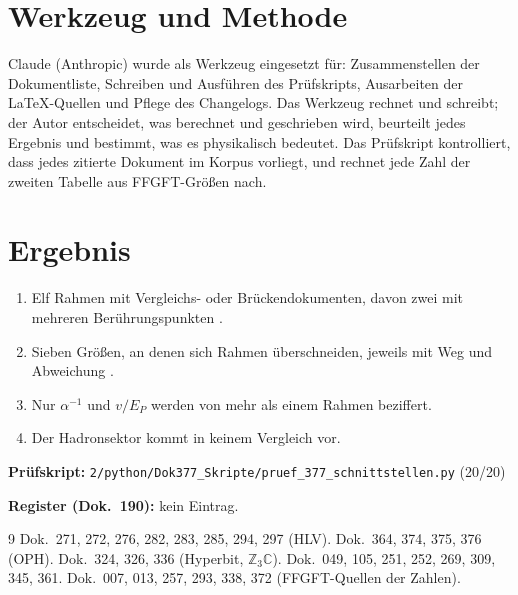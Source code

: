 \section*{Werkzeug und Methode}
Claude (Anthropic) wurde als Werkzeug eingesetzt für: Zusammenstellen der
Dokumentliste, Schreiben und Ausführen des Prüfskripts, Ausarbeiten der
\LaTeX-Quellen und Pflege des Changelogs. Das Werkzeug rechnet und schreibt;
der Autor entscheidet, was berechnet und geschrieben wird, beurteilt jedes
Ergebnis und bestimmt, was es physikalisch bedeutet. Das Prüfskript
kontrolliert, dass jedes zitierte Dokument im Korpus vorliegt, und rechnet
jede Zahl der zweiten Tabelle aus FFGFT-Größen nach.

\section{Ergebnis}

\begin{enumerate}
\item Elf Rahmen mit Vergleichs- oder Brückendokumenten, davon zwei mit
  mehreren Berührungspunkten \KM.
\item Sieben Größen, an denen sich Rahmen überschneiden, jeweils mit Weg und
  Abweichung \KM.
\item Nur $\alpha^{-1}$ und $v/E_P$ werden von mehr als einem Rahmen
  beziffert.
\item Der Hadronsektor kommt in keinem Vergleich vor.
\end{enumerate}

\medskip
\noindent\textbf{Prüfskript:} \texttt{2/python/Dok377\_Skripte/pruef\_377\_schnittstellen.py} (20/20)

\medskip
\noindent\textbf{Register (Dok.~190):} kein Eintrag.

\begin{thebibliography}{9}
 Dok.~271, 272, 276, 282, 283, 285, 294, 297 (HLV).
 Dok.~364, 374, 375, 376 (OPH).
 Dok.~324, 326, 336 (Hyperbit, $\mathbb{Z}_3\mathbb{C}$).
 Dok.~049, 105, 251, 252, 269, 309, 345, 361.
 Dok.~007, 013, 257, 293, 338, 372 (FFGFT-Quellen der Zahlen).
\end{thebibliography}
